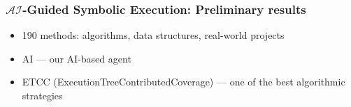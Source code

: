 \documentclass[xcolor=table,aspectratio=169]{beamer}
\begin{document}
\begin{frame}[fragile]
  \frametitle{$\mathcal{AI}$-Guided Symbolic Execution: Preliminary results}  
  \begin{itemize}
    \item 190 methods: algorithms, data structures, real-world projects
    \item AI --- our AI-based agent
    \item ETCC (ExecutionTreeContributedCoverage) --- one of the best algorithmic strategies
  \end{itemize}
  \begin{itemize}
  \end{itemize}
\end{frame}
\end{document}
